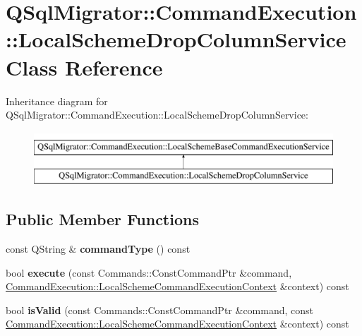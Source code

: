 \hypertarget{class_q_sql_migrator_1_1_command_execution_1_1_local_scheme_drop_column_service}{}\section{Q\+Sql\+Migrator\+:\+:Command\+Execution\+:\+:Local\+Scheme\+Drop\+Column\+Service Class Reference}
\label{class_q_sql_migrator_1_1_command_execution_1_1_local_scheme_drop_column_service}
Inheritance diagram for Q\+Sql\+Migrator\+:\+:Command\+Execution\+:\+:Local\+Scheme\+Drop\+Column\+Service\+:\begin{figure}[H]
\begin{center}
\leavevmode
\includegraphics[height=2.000000cm]{class_q_sql_migrator_1_1_command_execution_1_1_local_scheme_drop_column_service}
\end{center}
\end{figure}
\subsection*{Public Member Functions}
\begin{DoxyCompactItemize}
\item 
\mbox{\label{class_q_sql_migrator_1_1_command_execution_1_1_local_scheme_drop_column_service_a985f3c801230a52167cce23104d4da1e}} 
const Q\+String \& {\bfseries command\+Type} () const
\item 
\mbox{\label{class_q_sql_migrator_1_1_command_execution_1_1_local_scheme_drop_column_service_a7f3fe8272268c0437b1afc941b57aff0}} 
bool {\bfseries execute} (const Commands\+::\+Const\+Command\+Ptr \&command, \hyperlink{class_q_sql_migrator_1_1_command_execution_1_1_local_scheme_command_execution_context}{Command\+Execution\+::\+Local\+Scheme\+Command\+Execution\+Context} \&context) const
\item 
\mbox{\label{class_q_sql_migrator_1_1_command_execution_1_1_local_scheme_drop_column_service_a2c99111383f7a51a5f5b26101dee430d}} 
bool {\bfseries is\+Valid} (const Commands\+::\+Const\+Command\+Ptr \&command, const \hyperlink{class_q_sql_migrator_1_1_command_execution_1_1_local_scheme_command_execution_context}{Command\+Execution\+::\+Local\+Scheme\+Command\+Execution\+Context} \&context) const
\end{DoxyCompactItemize}


